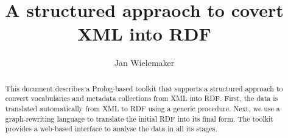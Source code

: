 \documentclass[11pt]{article}
\begin{document}
\title{A structured appraoch to covert XML into RDF}
\author{Jan Wielemaker}

\maketitle

\begin{abstract}
This document describes a Prolog-based toolkit that supports a
structured approach to convert vocabularies and metadata collections
from XML into RDF.  First, the data is translated automatically from
XML to RDF using a generic procedure.  Next, we use a graph-rewriting
language to translate the initial RDF into its final form.  The toolkit
provides a web-based interface to analyse the data in all its stages.
\end{abstract}

\pagebreak
\tableofcontents

\vfill
\vfill

\newpage


\end{document}
